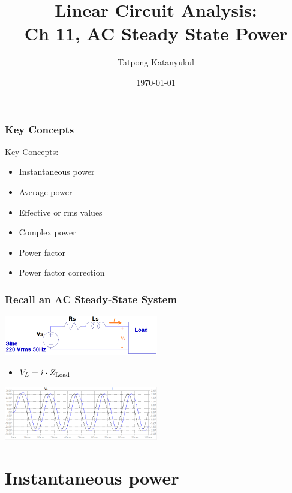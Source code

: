 \documentclass{beamer}
\title{Linear Circuit Analysis:\\
Ch 11, AC Steady State Power}
\author{Tatpong Katanyukul}
\institute{\vspace{-0.2in}\texttt{[image: ../shared/long-logo-color.png]}}
\date{\today}
\begin{document}
{
\begin{frame}
  \titlepage
\end{frame}
}%

\begin{frame}[fragile]

\frametitle{Key Concepts}

Key Concepts:
\begin{itemize}
\item Instantaneous power
\item Average power
\item Effective or rms values
\item Complex power
\item Power factor
\item Power factor correction
\end{itemize}

\end{frame}

\begin{frame}[fragile]
\frametitle{Recall an AC Steady-State System}

\begin{center}
\includegraphics[width=2.65in]{src/Fig01b.png}
\end{center}

\begin{itemize}
\item $V_L = i \cdot Z_{\rm{Load}}$
\end{itemize}

\begin{center}
\includegraphics[width=2.65in]{src/Fig02b.png}
\end{center}

\end{frame}


\section{Instantaneous power}
\end{document}
